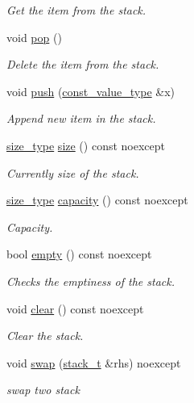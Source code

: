\begin{DoxyCompactItemize}
\begin{DoxyCompactList}\small\item\em Get the item from the stack. \end{DoxyCompactList}\item 
void \hyperlink{classatom_1_1stack__t_a86b9e880776b1ee326d07dee157c4991}{pop} ()
\begin{DoxyCompactList}\small\item\em Delete the item from the stack. \end{DoxyCompactList}\item 
void \hyperlink{classatom_1_1stack__t_aebddf7b02c7317f9edc25741412fccb7}{push} (\hyperlink{classatom_1_1stack__t_a780222269dc9f9323438ec4c56795735}{const\+\_\+value\+\_\+type} \&x)
\begin{DoxyCompactList}\small\item\em Append new item in the stack. \end{DoxyCompactList}\item 
\hyperlink{classatom_1_1stack__t_a43888b80c0b6cceea0509a3646823f98}{size\+\_\+type} \hyperlink{classatom_1_1stack__t_a7ae2d64181c0dcc03a54ca5df4c0de75}{size} () const noexcept
\begin{DoxyCompactList}\small\item\em Currently size of the stack. \end{DoxyCompactList}\item 
\hyperlink{classatom_1_1stack__t_a43888b80c0b6cceea0509a3646823f98}{size\+\_\+type} \hyperlink{classatom_1_1stack__t_ace44f2ab1b95b156fd30e25f26f8065e}{capacity} () const noexcept
\begin{DoxyCompactList}\small\item\em Capacity. \end{DoxyCompactList}\item 
bool \hyperlink{classatom_1_1stack__t_a3db873b3a1217f10fc1d6154d717b84d}{empty} () const noexcept
\begin{DoxyCompactList}\small\item\em Checks the emptiness of the stack. \end{DoxyCompactList}\item 
\mbox{\label{classatom_1_1stack__t_a2f631f7283574b82b0776c740a13d41a}} 
void \hyperlink{classatom_1_1stack__t_a2f631f7283574b82b0776c740a13d41a}{clear} () const noexcept
\begin{DoxyCompactList}\small\item\em Clear the stack. \end{DoxyCompactList}\item 
void \hyperlink{classatom_1_1stack__t_a05922491d108df9aeae30a5da18d7192}{swap} (\hyperlink{classatom_1_1stack__t}{stack\+\_\+t} \&rhs) noexcept
\begin{DoxyCompactList}\small\item\em swap two stack \end{DoxyCompactList}\end{DoxyCompactItemize}
